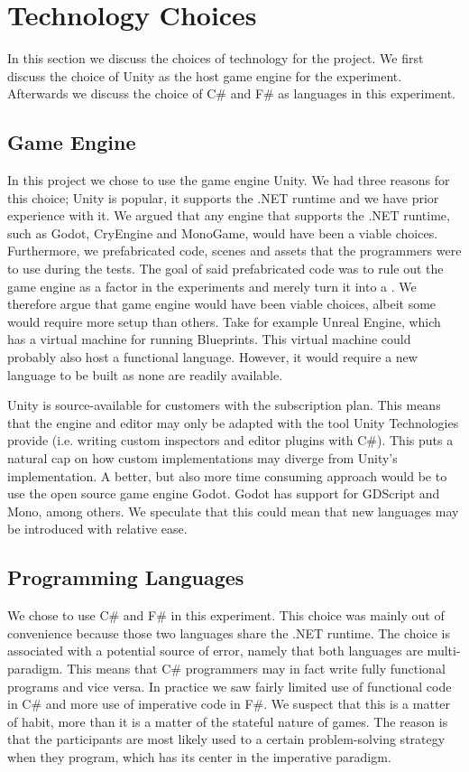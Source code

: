 \section{Technology Choices}
In this section we discuss the choices of technology for the project. We first discuss the choice of Unity as the host game engine for the experiment. Afterwards we discuss the choice of C\# and F\# as languages in this experiment.

\subsection{Game Engine}
In this project we chose to use the game engine Unity. We had three reasons for this choice; Unity is popular, it supports the .NET runtime and we have prior experience with it. We argued that any engine that supports the .NET runtime, such as Godot, CryEngine and MonoGame, would have been a viable choices. Furthermore, we prefabricated code, scenes and assets that the programmers were to use during the tests. The goal of said prefabricated code was to rule out the game engine as a factor in the experiments and merely turn it into a .
We therefore argue that game engine would have been viable choices, albeit some would require more setup than others. Take for example Unreal Engine, which has a virtual machine for running Blueprints\cite{unreal2019blueprintNativiziation}. This virtual machine could probably also host a functional language. However, it would require a new language to be built as none are readily available.

Unity is source-available for customers with the  subscription plan. This means that the engine and editor may only be adapted with the tool Unity Technologies provide (i.e. writing custom inspectors and editor plugins with C\#). This puts a natural cap on how  custom implementations may diverge from Unity's implementation. A better, but also more time consuming approach would be to use the open source game engine Godot. Godot has support for GDScript and Mono, among others. We speculate that this could mean that new languages may be introduced with relative ease.

\subsection{Programming Languages}
We chose to use C\# and F\# in this experiment. This choice was mainly out of convenience because those two languages share the .NET runtime. The choice is associated with a potential source of error, namely that both languages are multi-paradigm. This means that C\# programmers may in fact write fully functional programs and vice versa. In practice we saw fairly limited use of functional code in C\# and more use of imperative code in F\#. We suspect that this is a matter of habit, more than it is a matter of the stateful nature of games. The reason is that the participants are most likely used to a certain problem-solving strategy when they program, which has its center in the imperative paradigm. 


